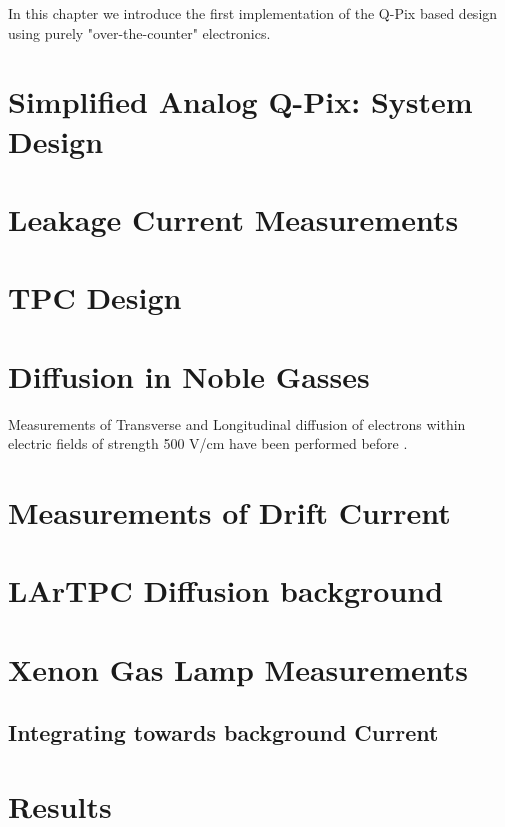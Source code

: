 In this chapter we introduce the first implementation of the Q-Pix based design using purely "over-the-counter" electronics.


\section{Simplified Analog Q-Pix: System Design}

\section{Leakage Current Measurements}

\section{TPC Design}

\section{Diffusion in Noble Gasses}

Measurements of Transverse and Longitudinal diffusion of electrons within electric fields of strength 500 V/cm have been performed before \citep{lar_diffusion_measurement_LI2016160}.

\section{Measurements of Drift Current}

\section{LArTPC Diffusion background}

\section{Xenon Gas Lamp Measurements}

\subsection{Integrating towards background Current}

\section{Results}